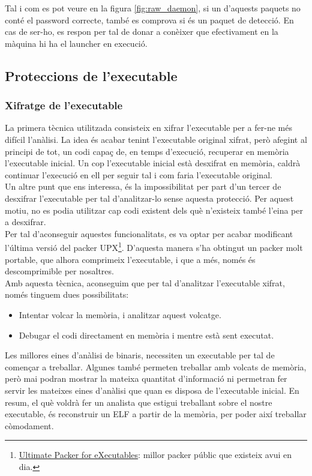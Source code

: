 Tal i com es pot veure en la figura \ref{fig:raw_daemon}, si un d'aquests paquets no conté el password correcte, també
es comprova si és un paquet de detecció. En cas de ser-ho, es respon per tal de donar a conèixer que 
efectivament en la màquina hi ha el launcher en execució. \\

\subsection{Proteccions de l'executable}
\subsubsection{Xifratge de l'executable}
La primera tècnica utilitzada consisteix en xifrar l'executable per a fer-ne més difícil l'anàlisi. La idea 
és acabar tenint l'executable original xifrat, però afegint al principi de tot, un codi capaç de, en temps 
d'execució, recuperar en memòria l'executable inicial. Un cop l'executable inicial està desxifrat en memòria,
caldrà continuar l'execució en ell per seguir tal i com faria l'executable original. \\

Un altre punt que ens interessa, és la impossibilitat per part d'un tercer de desxifrar l'executable per 
tal d'analitzar-lo sense aquesta protecció. Per aquest motiu, no es podia utilitzar cap codi existent
dels què n'existeix també l'eina per a desxifrar. \\

Per tal d'aconseguir aquestes funcionalitats, es va optar per acabar modificant 
l'última versió del packer UPX\footnote{\href{http://upx.sourceforge.net/}{Ultimate Packer for eXecutables}: 
millor packer públic que existeix avui en dia.}. D'aquesta manera s'ha obtingut un packer molt portable, que alhora 
comprimeix l'executable, i que a més, només és descomprimible per nosaltres. \\

Amb aquesta tècnica, aconseguim que per tal d'analitzar l'executable xifrat, només tinguem dues possibilitats: 
\begin{itemize}
	\item Intentar volcar la memòria, i analitzar aquest volcatge.
	\item Debugar el codi directament en memòria i mentre està sent executat.
\end{itemize}

Les millores eines d'anàlisi de binaris, necessiten un executable per tal de començar a treballar. Algunes
també permeten treballar amb volcats de memòria, però mai podran mostrar la mateixa quantitat d'informació
ni permetran fer servir les mateixes eines d'anàlisi que quan es disposa de l'executable inicial. En resum,
el què voldrà fer un analista que estigui treballant sobre el nostre executable, és reconstruir un ELF 
a partir de la memòria, per poder així treballar còmodament. \\

